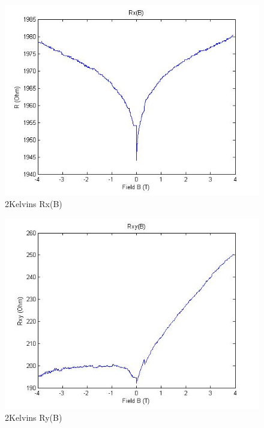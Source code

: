 \documentclass[idxtotoc,hyperref,openany,oneside]{labbook} %
\begin{document}
\begin{figure}[H] %
\begin{center}
\includegraphics[width=1\linewidth]{7462kRx(B).jpg}
\end{center}
\caption{2Kelvins Rx(B)}
\label{fig:fig2}
\end{figure}

\begin{figure}[H] %
\begin{center}
\includegraphics[width=1\linewidth]{7462kRy(B).jpg}
\end{center}
\caption{2Kelvins Ry(B)}
\label{fig:fig3}
\end{figure}
\end{document}
